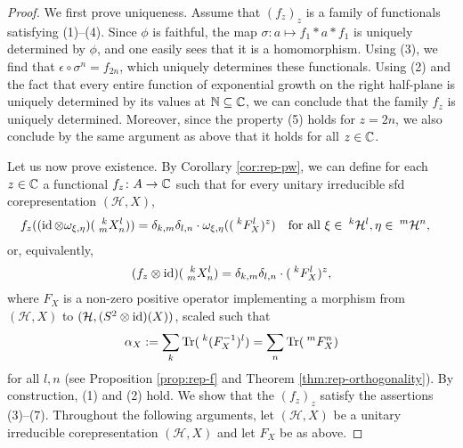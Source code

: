 \begin{proof}
  We first prove uniqueness.  Assume that $(f_{z})_{z}$ is a family of
  functionals satisfying (1)--(4).  Since $\phi$ is faithful, the map
  $\sigma\colon a \mapsto f_{1} \ast a \ast f_{1}$ is uniquely
  determined by $\phi$, and one easily sees that it is a homomorphism. Using
  (3), we find that $\epsilon \circ \sigma^n=f_{2n}$, which uniquely determines these functionals. Using (2) and the
  fact that every entire function of exponential growth on the right
  half-plane is uniquely determined by its values at $\N \subseteq \C$, we can conclude that the family $f_{z}$ is uniquely determined. Moreover, since the property (5) holds for $z = 2n$, we also conclude by the same argument as above that it holds for all $z\in \C$.

  Let us now prove existence.  By Corollary \ref{cor:rep-pw}, we can
  define for each $z\in \C$ a functional $f_{z} \colon A \to \C$ such
  that for every unitary irreducible sfd corepresentation
  $(\mathcal{H},X)$,
    \begin{align*}
      f_{z}((\id \otimes \omega_{\xi,\eta})(\Gr{X}{k}{l}{m}{n})) &=
      \delta_{k,m}\delta_{l,n} \cdot
      \omega_{\xi,\eta}((\Gru{F_{X}}{k}{l})^{z}) \quad \text{for all }
      \xi \in \Gru{\mathcal{H}}{k}{l},\eta \in
      \Gru{\mathcal{H}}{m}{n},
    \end{align*}
    or, equivalently,
    \begin{align*}
      (f_{z} \otimes \id)(\Gr{X}{k}{l}{m}{n}) =
      \delta_{k,m}\delta_{l,n} \cdot (\Gru{F_{X}}{k}{l})^{z},
    \end{align*}
    where $F_{X}$ is a non-zero positive operator implementing a morphism from $(\mathcal{H},X)$ to
    $(\mathcal{H}, (S^{2} \otimes \id)(X))$, scaled such that
    \begin{align*}
      \alpha_{X}:= \sum_{k} \Tr(\Gru{(F_{X}^{-1})}{k}{l}) = \sum_{n}
      \Tr(\Gru{F_{X}}{m}{n})
    \end{align*}
    for all $l,n$ (see Proposition \ref{prop:rep-f} and Theorem \ref{thm:rep-orthogonality}). By
    construction, (1) and (2) hold. We show that the $(f_{z})_{z}$ satisfy the
    assertions (3)--(7). 
    Throughout the following arguments, let 
    $(\mathcal{H},X)$ be a unitary irreducible corepresentation
    $(\mathcal{H},X)$ and let $F_{X}$ be as above.


\end{proof}
